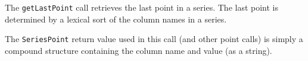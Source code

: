 The \verb+getLastPoint+ call retrieves the last point in a series. The last point is determined by a
lexical sort of the column names in a series.

The \verb+SeriesPoint+ return value used in this call (and other point calls) is simply a compound
structure containing the column name and value (as a string).
